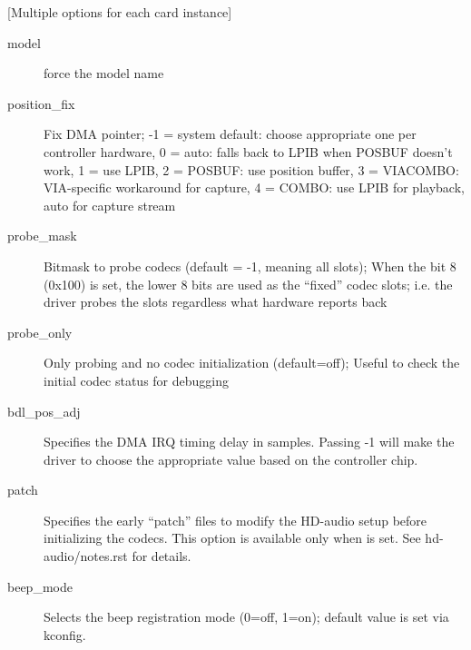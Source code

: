 \documentclass[a4paper,8pt,english]{sphinxmanual}
\begin{document}
{[}Multiple options for each card instance{]}
\begin{description}
\item[{model}] \leavevmode
force the model name

\item[{position\_fix}] \leavevmode
Fix DMA pointer;
-1 = system default: choose appropriate one per controller hardware,
0 = auto: falls back to LPIB when POSBUF doesn't work,
1 = use LPIB,
2 = POSBUF: use position buffer,
3 = VIACOMBO: VIA-specific workaround for capture,
4 = COMBO: use LPIB for playback, auto for capture stream

\item[{probe\_mask}] \leavevmode
Bitmask to probe codecs (default = -1, meaning all slots);
When the bit 8 (0x100) is set, the lower 8 bits are used
as the ``fixed'' codec slots; i.e. the driver probes the
slots regardless what hardware reports back

\item[{probe\_only}] \leavevmode
Only probing and no codec initialization (default=off);
Useful to check the initial codec status for debugging

\item[{bdl\_pos\_adj}] \leavevmode
Specifies the DMA IRQ timing delay in samples.
Passing -1 will make the driver to choose the appropriate
value based on the controller chip.

\item[{patch}] \leavevmode
Specifies the early ``patch'' files to modify the HD-audio setup
before initializing the codecs.
This option is available only when 
is set.  See hd-audio/notes.rst for details.

\item[{beep\_mode}] \leavevmode
Selects the beep registration mode (0=off, 1=on);
default value is set via  kconfig.

\end{description}
\end{document}
